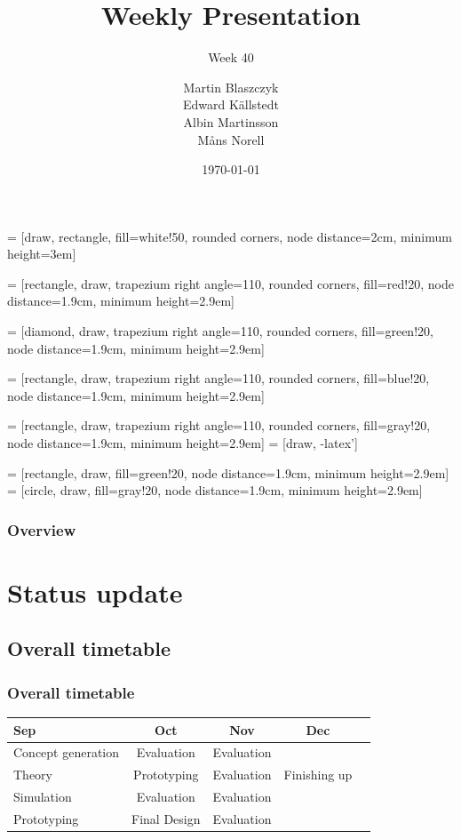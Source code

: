 \documentclass{beamer}
\title{Weekly Presentation}
\subtitle{Week 40}
\author{Martin Blaszczyk\\
        Edward Källstedt \\
        Albin Martinsson\\
        Måns Norell
        }
\institute{Luleå University of Technology}
\date{\today}
\begin{document}
 = [draw, rectangle, fill=white!50, rounded corners, node distance=2cm,
                    minimum height=3em]

 = [rectangle, draw, trapezium right angle=110, rounded corners,
                  fill=red!20, node distance=1.9cm, minimum height=2.9em]

 = [diamond, draw, trapezium right angle=110, rounded corners,
                  fill=green!20, node distance=1.9cm, minimum height=2.9em]

 = [rectangle, draw, trapezium right angle=110, rounded corners,
                  fill=blue!20, node distance=1.9cm, minimum height=2.9em]

 = [rectangle, draw, trapezium right angle=110, rounded corners,
                  fill=gray!20, node distance=1.9cm, minimum height=2.9em]
 = [draw, -latex']

 = [rectangle, draw, fill=green!20, node distance=1.9cm, minimum height=2.9em]
 = [circle, draw,
                  fill=gray!20, node distance=1.9cm, minimum height=2.9em]



\begin{frame}
    \titlepage
\end{frame}

\begin{frame}
    \frametitle{Overview}
    \tableofcontents
\end{frame}
\section{Status update}
\begin{frame}
    \subsection{Overall timetable}
    \frametitle{Overall timetable}
    \begin{table}
        \begin{tabular}{| l | c | c | c | c }

            Sep & Oct & Nov & Dec \\
            \hline \hline
            Concept generation & Evaluation & Evaluation &  \\
            \hline
            Theory & Prototyping & Evaluation & Finishing up \\
            \hline
            Simulation & Evaluation & Evaluation & \\
            \hline
            Prototyping & Final Design & Evaluation &  \\
            \hline

        \end{tabular}
    \end{table}
\end{frame}
\end{document}
